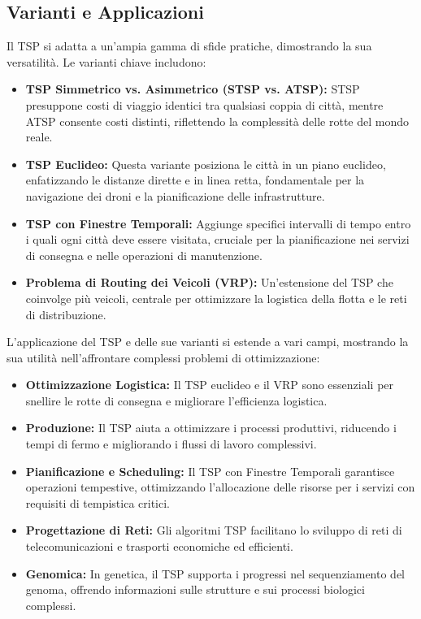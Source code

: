 \subsection{Varianti e Applicazioni}

Il \gls{TSP} si adatta a un'ampia gamma di sfide pratiche, dimostrando la sua versatilità. Le varianti chiave includono:

\begin{itemize}
	\item \textbf{TSP Simmetrico vs. Asimmetrico (STSP vs. ATSP):} STSP presuppone costi di viaggio identici tra qualsiasi coppia di città, mentre ATSP consente costi distinti, riflettendo la complessità delle rotte del mondo reale.
	\item \textbf{TSP Euclideo:} Questa variante posiziona le città in un piano euclideo, enfatizzando le distanze dirette e in linea retta, fondamentale per la navigazione dei droni e la pianificazione delle infrastrutture.
	\item \textbf{TSP con Finestre Temporali:} Aggiunge specifici intervalli di tempo entro i quali ogni città deve essere visitata, cruciale per la pianificazione nei servizi di consegna e nelle operazioni di manutenzione.
	\item \textbf{Problema di Routing dei Veicoli (VRP):} Un'estensione del \gls{TSP} che coinvolge più veicoli, centrale per ottimizzare la logistica della flotta e le reti di distribuzione.
\end{itemize}

L'applicazione del \gls{TSP} e delle sue varianti si estende a vari campi, mostrando la sua utilità nell'affrontare complessi problemi di ottimizzazione:

\begin{itemize}
	\item \textbf{Ottimizzazione Logistica:} Il \gls{TSP} euclideo e il VRP sono essenziali per snellire le rotte di consegna e migliorare l'efficienza logistica.
	\item \textbf{Produzione:} Il \gls{TSP} aiuta a ottimizzare i processi produttivi, riducendo i tempi di fermo e migliorando i flussi di lavoro complessivi.
	\item \textbf{Pianificazione e Scheduling:} Il \gls{TSP} con Finestre Temporali garantisce operazioni tempestive, ottimizzando l'allocazione delle risorse per i servizi con requisiti di tempistica critici.
	\item \textbf{Progettazione di Reti:} Gli algoritmi \gls{TSP} facilitano lo sviluppo di reti di telecomunicazioni e trasporti economiche ed efficienti.
	\item \textbf{Genomica:} In genetica, il \gls{TSP} supporta i progressi nel sequenziamento del genoma, offrendo informazioni sulle strutture e sui processi biologici complessi.
\end{itemize}

